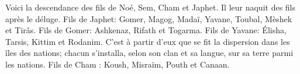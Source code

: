 Voici la descendance des fils de Noé, Sem, Cham et Japhet.
	Il leur naquit des fils après le déluge.
Fils de Japhet: Gomer, Magog, Madaï, Yavane, Toubal, Mèshek et Tirâs.
Fils de Gomer: Ashkenaz, Rifath et Togarma.
Fils de Yavane: Élisha, Tarsis, Kittim et Rodanim.
C’est à partir d’eux que se fit la dispersion dans les îles des nations;
	chacun s’installa, selon son clan et sa langue,
	sur sa terre parmi les nations.
Fils de Cham : Koush, Misraïm, Pouth et Canaan.